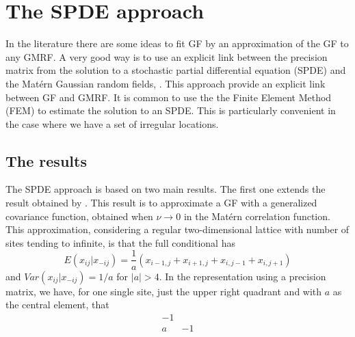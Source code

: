 \chapter{The SPDE approach}\label{ch:spde} 

In the literature there are some ideas to 
fit GF by an approximation of the GF to any GMRF. 
A very good way is to use an explicit link between 
the precision matrix from the solution to a 
stochastic partial differential equation (SPDE) 
and the Mat\'ern Gaussian random fields, 
\cite{lindgrenRL:2011}. 
This approach provide an explicit link between GF and GMRF. 
It is common to use the the Finite Element Method (FEM)
to estimate the solution to an SPDE. 
This is particularly convenient in the case 
where we have a set of irregular locations. 

\section{The \cite{lindgrenRL:2011} results} 

The SPDE approach is based on two main results. 
The first one extends the result obtained by \cite{besag:1981}. 
This result is to approximate a GF with a generalized 
covariance function, obtained when $\nu \rightarrow 0$ 
in the Mat\'ern correlation function. 
This approximation, considering a regular two-dimensional 
lattice with number of sites tending to infinite, 
is that the full conditional has 
\begin{equation}
E(x_{ij}|x_{-ij}) = \frac{1}{a}(x_{i-1,j}+x_{i+1,j}+x_{i,j-1}+x_{i,j+1})
\end{equation}
and $Var(x_{ij}|x_{-ij}) = 1/a$ for $|a|>4$. 
In the representation using a precision matrix, 
we have, for one single site, just the upper right 
quadrant and with $a$ as the central element, that 
\begin{equation}\label{eq:q0}
\begin{matrix}
-1  & \\
a & -1
\end{matrix}
\end{equation}

